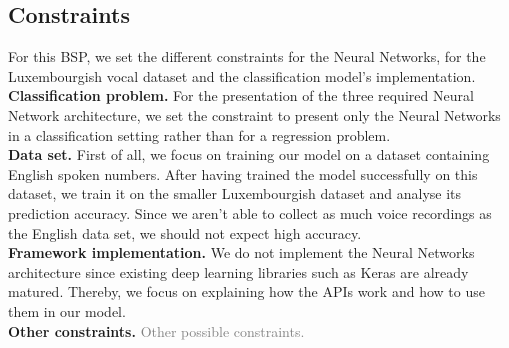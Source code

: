 \subsection{Constraints}

For this BSP, we set the different constraints for the Neural Networks, for the
Luxembourgish vocal dataset and the classification model's implementation.\\


\textbf{Classification problem.} For the presentation of the three required
Neural Network architecture, we set the constraint to present only the Neural
Networks in a classification setting rather than for a regression problem. \\

\textbf{Data set.} First of all, we focus on training our model on a dataset
containing English spoken numbers. After having trained the model successfully
on this dataset, we train it on the smaller Luxembourgish dataset and analyse
its prediction accuracy. Since we aren't able to collect as much voice
recordings as the English data set, we should not expect high accuracy.\\


\textbf{Framework implementation.} We do not implement the Neural Networks
architecture since existing deep learning libraries such as Keras are already
matured. Thereby, we focus on explaining how the APIs work and how to use them
in our model.\\

\textbf{Other constraints.} \textcolor{gray}{Other possible constraints.}
